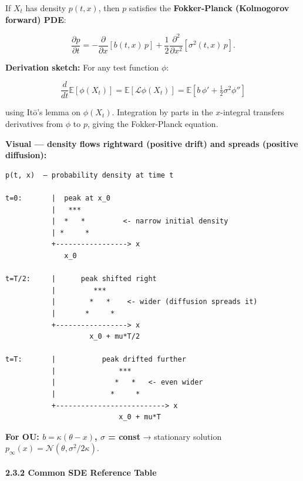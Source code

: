 \documentclass[11pt,a4paper]{article}
\begin{document}
If \(X_t\) has density \(p(t,x)\), then \(p\) satisfies the \textbf{Fokker-Planck (Kolmogorov forward) PDE}:

\[\frac{\partial p}{\partial t} = -\frac{\partial}{\partial x}[b(t,x)\,p] + \frac{1}{2}\frac{\partial^2}{\partial x^2}[\sigma^2(t,x)\,p].\]

\textbf{Derivation sketch:} For any test function \(\phi\):

\[\frac{d}{dt}\mathbb{E}[\phi(X_t)] = \mathbb{E}[\mathcal{L}\phi(X_t)] = \mathbb{E}\!\left[b\,\phi' + \tfrac12\sigma^2\phi''\right]\]

using Itō's lemma on \(\phi(X_t)\). Integration by parts in the \(x\)-integral transfers derivatives from \(\phi\) to \(p\), giving the Fokker-Planck equation.

\textbf{Visual --- density flows rightward (positive drift) and spreads (positive diffusion):}

\begin{verbatim}
p(t, x)  — probability density at time t

t=0:       |  peak at x_0
           |   ***
           |  *   *         <- narrow initial density
           | *     *
           +-----------------> x
              x_0

t=T/2:     |      peak shifted right
           |         ***
           |        *   *    <- wider (diffusion spreads it)
           |       *     *
           +-----------------> x
                    x_0 + mu*T/2

t=T:       |           peak drifted further
           |               ***
           |              *   *   <- even wider
           |             *     *
           +--------------------------> x
                           x_0 + mu*T
\end{verbatim}

\textbf{For OU: \(b = \kappa(\theta-x)\), \(\sigma\) = const} → stationary solution \(p_\infty(x) = \mathcal{N}(\theta, \sigma^2/2\kappa)\).

\paragraph{2.3.2 Common SDE Reference Table}\label{common-sde-reference-table}
\end{document}
